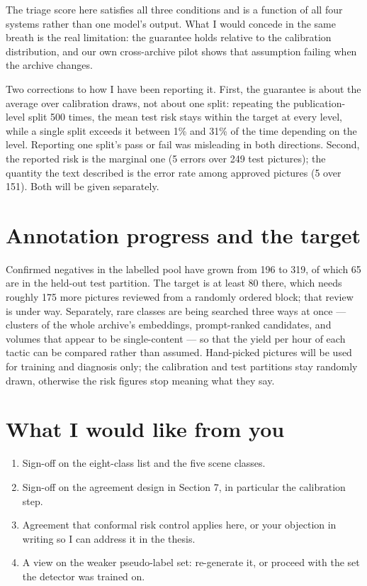 \documentclass[11pt,a4paper]{article}
\begin{document}
The triage score here satisfies all three conditions and is a function of all four systems rather than
one model's output. What I would concede in the same breath is the real limitation: the guarantee holds
relative to the calibration distribution, and our own cross-archive pilot shows that assumption failing
when the archive changes.

Two corrections to how I have been reporting it. First, the guarantee is about the average over
calibration draws, not about one split: repeating the publication-level split 500 times, the mean test
risk stays within the target at every level, while a single split exceeds it between 1\% and 31\% of the
time depending on the level. Reporting one split's pass or fail was misleading in both directions.
Second, the reported risk is the marginal one (5 errors over 249 test pictures); the quantity the text
described is the error rate among approved pictures (5 over 151). Both will be given separately.

\section{Annotation progress and the target}

Confirmed negatives in the labelled pool have grown from 196 to 319, of which 65 are in the held-out
test partition. The target is at least 80 there, which needs roughly 175 more pictures reviewed from a
randomly ordered block; that review is under way. Separately, rare classes are being searched three
ways at once --- clusters of the whole archive's embeddings, prompt-ranked candidates, and volumes that
appear to be single-content --- so that the yield per hour of each tactic can be compared rather than
assumed. Hand-picked pictures will be used for training and diagnosis only; the calibration and test
partitions stay randomly drawn, otherwise the risk figures stop meaning what they say.

\section*{What I would like from you}

\begin{enumerate}
\item Sign-off on the eight-class list and the five scene classes.
\item Sign-off on the agreement design in Section 7, in particular the calibration step.
\item Agreement that conformal risk control applies here, or your objection in writing so I can address
      it in the thesis.
\item A view on the weaker pseudo-label set: re-generate it, or proceed with the set the detector was
      trained on.
\end{enumerate}
\end{document}
